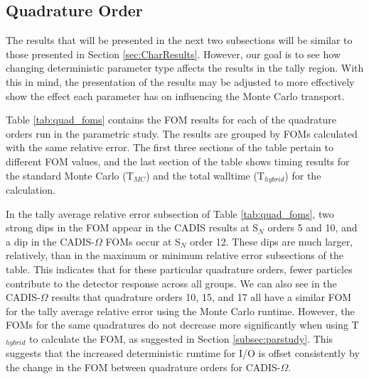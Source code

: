 % 

\subsection{Quadrature Order}
\label{subsec:quadorder}

The results that will be presented in the next two subsections will be similar
to those presented in Section \ref{sec:CharResults}. However, our goal is to see
how changing deterministic parameter type affects the results in the tally
region. With this in mind, the presentation of the results may be adjusted to
more effectively show the effect each parameter has on influencing the Monte
Carlo transport.

Table \ref{tab:quad_foms} contains the FOM results for each of the quadrature
orders run in the parametric study. The results are grouped by FOMs calculated
with the same relative error. The first three sections of the table
pertain to different FOM values, and the last section of the table shows timing
results for the standard Monte Carlo (T$_{MC}$) and the total walltime
(T$_{hybrid}$) for the calculation.

In the tally average relative error subsection of Table \ref{tab:quad_foms},
two strong
dips in the FOM appear in the CADIS results at S$_N$ orders 5 and 10,
and a dip in the CADIS-$\Omega$ FOMs
occur at S$_N$ order 12. These dips are much larger, relatively, than in the maximum or
minimum relative error subsections of the table. This indicates that for these
particular quadrature orders, fewer particles contribute to the
detector response across all groups. We can also see in the CADIS-$\Omega$
results that
quadrature orders 10, 15, and 17 all have a similar FOM for the tally average
relative error using the Monte Carlo runtime. However, the FOMs for the same
quadratures do not decrease more significantly when using T$_{hybrid}$ to calculate the
FOM, as suggested in Section \ref{subsec:parstudy}. This suggests that the
increased deterministic runtime for I/O is offset consistently by the change in
the FOM between quadrature orders for CADIS-$\Omega$.

